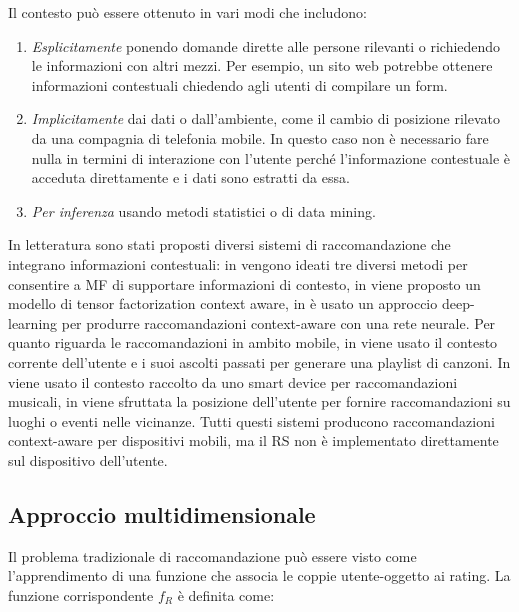 \documentclass[12pt,italian]{report}
\begin{document}

\noindent Il contesto può essere ottenuto in vari modi \cite{recsys-handbook} che includono:
\begin{enumerate}
 \item \textit{Esplicitamente} ponendo domande dirette alle persone rilevanti o richiedendo le informazioni con altri mezzi. Per esempio, un sito web potrebbe ottenere informazioni contestuali chiedendo agli utenti di compilare un form.
 \item \textit{Implicitamente} dai dati o dall'ambiente, come il cambio di posizione rilevato da una compagnia di telefonia mobile. In questo caso non è necessario fare nulla in termini di interazione con l'utente perché l'informazione contestuale è acceduta direttamente e i dati sono estratti da essa.
 \item \textit{Per inferenza} usando metodi statistici o di data mining. 
\end{enumerate}
In letteratura sono stati proposti diversi sistemi di raccomandazione che integrano informazioni contestuali: in \cite{mf-context-aware} vengono ideati tre diversi metodi per consentire a MF di supportare informazioni di contesto, in \cite{tensor-context-aware} viene proposto un modello di tensor factorization context aware, in \cite{context-aware-deep-learning} è usato un approccio deep-learning per produrre raccomandazioni context-aware con una rete neurale. Per quanto riguarda le raccomandazioni in ambito mobile, in \cite{cars-music2} viene usato il contesto corrente dell'utente e i suoi ascolti passati per generare una playlist di canzoni. In \cite{cars-music} viene usato il contesto raccolto da uno smart device per raccomandazioni musicali, in \cite{cars-location} viene sfruttata la posizione dell'utente per fornire raccomandazioni su luoghi o eventi nelle vicinanze. Tutti questi sistemi producono raccomandazioni context-aware per dispositivi mobili, ma il RS non è implementato direttamente sul dispositivo dell'utente.

\subsection{Approccio multidimensionale} \label{subsec:multidim}
Il problema tradizionale di raccomandazione può essere visto come l'apprendimento di una funzione che associa le coppie utente-oggetto ai rating. La funzione corrispondente $f_R$ è definita come:
\end{document}
